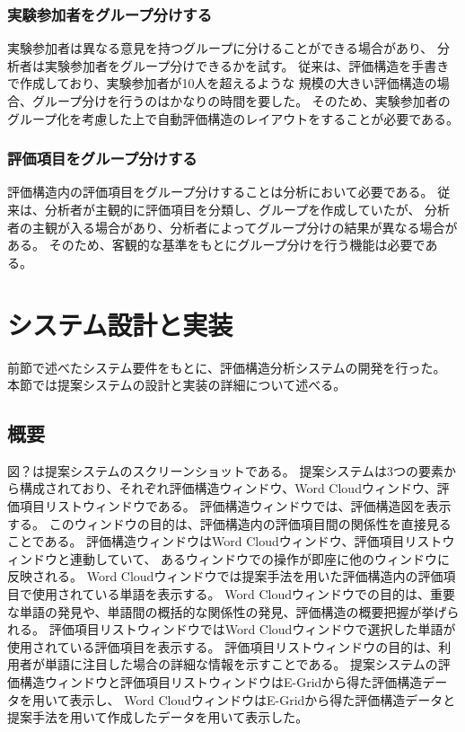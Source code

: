 \documentclass[syuuron]{kuee}
\begin{document}
		\subsubsection{実験参加者をグループ分けする}%
			実験参加者は異なる意見を持つグループに分けることができる場合があり、
			分析者は実験参加者をグループ分けできるかを試す。
			従来は、評価構造を手書きで作成しており、実験参加者が10人を超えるような
			規模の大きい評価構造の場合、グループ分けを行うのはかなりの時間を要した。
			そのため、実験参加者のグループ化を考慮した上で自動評価構造のレイアウトをすることが必要である。
		\subsubsection{評価項目をグループ分けする}%
			評価構造内の評価項目をグループ分けすることは分析において必要である。
			従来は、分析者が主観的に評価項目を分類し、グループを作成していたが、
			分析者の主観が入る場合があり、分析者によってグループ分けの結果が異なる場合がある。
			そのため、客観的な基準をもとにグループ分けを行う機能は必要である。
	\section{システム設計と実装}
		前節で述べたシステム要件をもとに、評価構造分析システムの開発を行った。
		本節では提案システムの設計と実装の詳細について述べる。
		\subsection{概要}
			図？は提案システムのスクリーンショットである。
			提案システムは3つの要素から構成されており、それぞれ評価構造ウィンドウ、Word Cloudウィンドウ、評価項目リストウィンドウである。
			評価構造ウィンドウでは、評価構造図を表示する。
			このウィンドウの目的は、評価構造内の評価項目間の関係性を直接見ることである。
			評価構造ウィンドウはWord Cloudウィンドウ、評価項目リストウィンドウと連動していて、
			あるウィンドウでの操作が即座に他のウィンドウに反映される。
			Word Cloudウィンドウでは提案手法を用いた評価構造内の評価項目で使用されている単語を表示する。
			Word Cloudウィンドウでの目的は、重要な単語の発見や、単語間の概括的な関係性の発見、評価構造の概要把握が挙げられる。
			評価項目リストウィンドウではWord Cloudウィンドウで選択した単語が使用されている評価項目を表示する。
			評価項目リストウィンドウの目的は、利用者が単語に注目した場合の詳細な情報を示すことである。
			提案システムの評価構造ウィンドウと評価項目リストウィンドウはE-Gridから得た評価構造データを用いて表示し、
			Word CloudウィンドウはE-Gridから得た評価構造データと提案手法を用いて作成したデータを用いて表示した。
			
\end{document}
